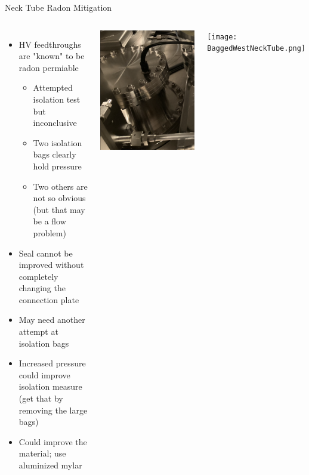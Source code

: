 \documentclass{beamer}
\begin{document}
\begin{frame}{Neck Tube Radon Mitigation}
	\begin{columns}
	\begin{itemize}
	\item HV feedthroughs are "known" to be radon permiable
		\begin{itemize}
		\item Attempted isolation test but inconclusive
		\item Two isolation bags clearly hold pressure
		\item Two others are not so obvious (but that may be a flow problem)
		\end{itemize}
	\item Seal cannot be improved without completely changing the connection plate
	\item May need another attempt at isolation bags
	\item Increased pressure could improve isolation measure (get that by removing the large bags)
	\item Could improve the material; use aluminized mylar
	\end{itemize}
	\includegraphics[width=\textwidth]{NeckTubeFeedthrough.png}
	
	\texttt{[image: BaggedWestNeckTube.png]}
	\end{columns}
	
\end{frame}
\end{document}
